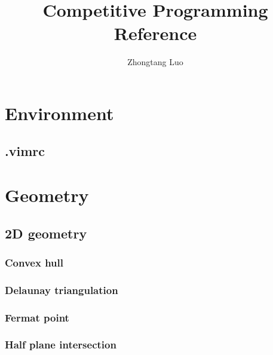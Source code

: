 \documentclass[titlepage,letterpaper,10pt]{article}
\title{Competitive Programming Reference}
\author{Zhongtang Luo}
\date{
    \today \\
    \vspace{100pt}
    \noindent\rule{\textwidth}{1pt}\\
    \vspace{100pt}
    {
        \centering
        \protect\RecustomVerbatimEnvironment{Verbatim}{BVerbatim}{}
        \inputminted{text}{LICENSE}
    }
}
\begin{document}
    \maketitle
    \linespread{0.8}\selectfont
    \begin{multicols}{2}
        \setcounter{tocdepth}{3}
        \tableofcontents
        
        
        \section{Environment}
            \subsection{.vimrc}
                
        
        \section{Geometry}
            
            \subsection{2D geometry}
                
				\subsubsection{Convex hull}
					
				\subsubsection{Delaunay triangulation}
					
				\subsubsection{Fermat point}
					
				\subsubsection{Half plane intersection}
					

\end{multicols}
\end{document}

